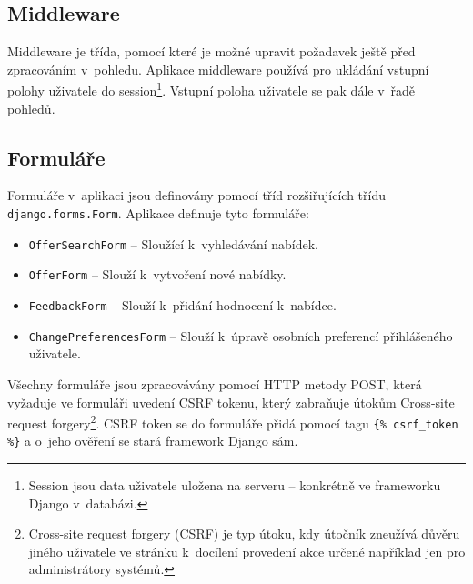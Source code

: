 \subsection{Middleware}
Middleware je třída, pomocí které je možné upravit požadavek ještě před zpracováním v~pohledu. Aplikace middleware používá pro ukládání vstupní polohy uživatele do session\footnote{Session jsou data uživatele uložena na serveru -- konkrétně ve frameworku Django v~databázi.}. Vstupní poloha uživatele se pak dále v~řadě pohledů.

\subsection{Formuláře}
\begin{sloppypar}
Formuláře v~aplikaci jsou definovány pomocí tříd rozšiřujících třídu \texttt{django.forms.Form}.
Aplikace definuje tyto formuláře:
\begin{itemize}
    \item \texttt{OfferSearchForm} -- Sloužící k~vyhledávání nabídek.
    \item \texttt{OfferForm} -- Slouží k~vytvoření nové nabídky.
    \item \texttt{FeedbackForm} -- Slouží k~přidání hodnocení k~nabídce.
    \item \texttt{ChangePreferencesForm} -- Slouží k~úpravě osobních preferencí přihlášeného uživatele.
\end{itemize}
Všechny formuláře jsou zpracovávány pomocí HTTP metody POST, která vyžaduje ve formuláři uvedení CSRF tokenu, který zabraňuje útokům Cross-site request forgery\footnote{Cross-site request forgery (CSRF) je typ útoku, kdy útočník zneužívá důvěru jiného uživatele ve stránku k~docílení provedení akce určené například jen pro administrátory systémů.}. CSRF token se do formuláře přidá pomocí tagu \mbox{\texttt{\{\% csrf\_token \%\}}} a o~jeho ověření se stará framework Django sám.
\end{sloppypar}